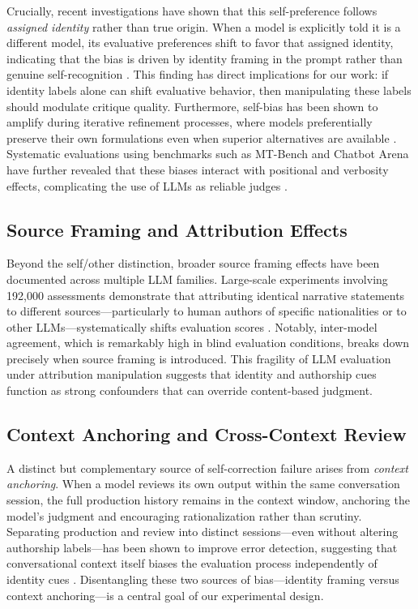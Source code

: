 \documentclass[11pt]{article}
\begin{document}
Crucially, recent investigations have shown that this self-preference follows \emph{assigned identity} rather than true origin. When a model is explicitly told it is a different model, its evaluative preferences shift to favor that assigned identity, indicating that the bias is driven by identity framing in the prompt rather than genuine self-recognition \citep{lehr2025extremeselfpreference}. This finding has direct implications for our work: if identity labels alone can shift evaluative behavior, then manipulating these labels should modulate critique quality. Furthermore, self-bias has been shown to amplify during iterative refinement processes, where models preferentially preserve their own formulations even when superior alternatives are available \citep{xu2024pride}. Systematic evaluations using benchmarks such as MT-Bench and Chatbot Arena have further revealed that these biases interact with positional and verbosity effects, complicating the use of LLMs as reliable judges \citep{zheng2024judging}.

\subsection{Source Framing and Attribution Effects}

Beyond the self/other distinction, broader source framing effects have been documented across multiple LLM families. Large-scale experiments involving 192,000 assessments demonstrate that attributing identical narrative statements to different sources---particularly to human authors of specific nationalities or to other LLMs---systematically shifts evaluation scores \citep{germani2025sourceframing}. Notably, inter-model agreement, which is remarkably high in blind evaluation conditions, breaks down precisely when source framing is introduced. This fragility of LLM evaluation under attribution manipulation suggests that identity and authorship cues function as strong confounders that can override content-based judgment.

\subsection{Context Anchoring and Cross-Context Review}

A distinct but complementary source of self-correction failure arises from \emph{context anchoring}. When a model reviews its own output within the same conversation session, the full production history remains in the context window, anchoring the model's judgment and encouraging rationalization rather than scrutiny. Separating production and review into distinct sessions---even without altering authorship labels---has been shown to improve error detection, suggesting that conversational context itself biases the evaluation process independently of identity cues \citep{song2026crosscontext}. Disentangling these two sources of bias---identity framing versus context anchoring---is a central goal of our experimental design.
\end{document}
